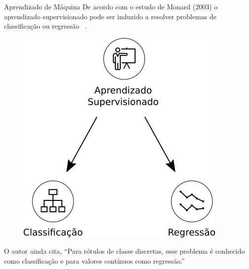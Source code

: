 \documentclass[10pt]{beamer}
\begin{document}
  \begin{frame}[fragile]{Aprendizado de Máquina}
    De acordo com o estudo de Monard (2003) o aprendizado supervisionado pode ser induzido a resolver problemas de classificação ou regressão ~\cite{monard_baranauskas:2003}.
    \begin{figure}[H]
    \begin{center}
        \includegraphics[scale=0.45]{regression_classification.png}
    \end{center}
    \end{figure}
    O autor ainda cita, ``Para rótulos de classe discretas, esse problema é conhecido como classificação e para valores contínuos como regressão.''
  \end{frame}
\end{document}
